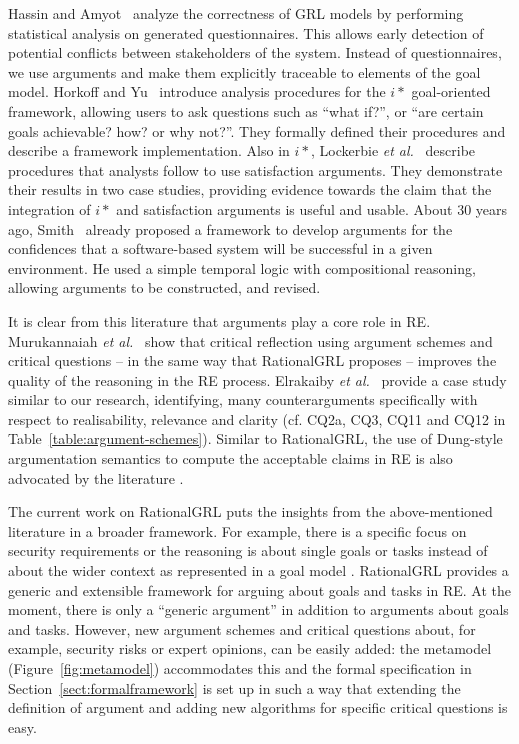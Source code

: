 Hassin and Amyot~\cite{hassine2016questionnaire} analyze the correctness of GRL models by performing statistical analysis on generated questionnaires. This allows early detection of potential conflicts between stakeholders of the system. Instead of questionnaires, we use arguments and make them explicitly traceable to elements of the goal model. Horkoff and Yu~\cite{horkoff2016interactive} introduce analysis procedures for the $i*$ goal-oriented framework, allowing users to ask questions such as ``what if?'', or ``are certain goals achievable? how? or why not?''. They formally defined their procedures and describe a framework implementation. Also in $i*$, Lockerbie \emph{et al.}~\cite{lockerbie2012exploring} describe procedures that analysts follow to use satisfaction arguments. They demonstrate their results in two case studies, providing evidence towards the claim that the integration of $i*$ and satisfaction arguments is useful and usable. About 30 years ago, Smith~\cite{Smith:1997:CRF:2737426.2737493} already proposed a framework to develop arguments for the confidences that a software-based system will be successful in a given environment. He used a simple temporal logic with compositional reasoning, allowing arguments to be constructed, and revised. 


It is clear from this literature that arguments play a core role in RE. Murukannaiah \emph{et al.}~\cite{murukannaiah2015} show that critical reflection using argument schemes and critical questions -- in the same way that RationalGRL proposes -- improves the quality of the reasoning in the RE process. Elrakaiby \emph{et al.}~\cite{ElrakaibyFSGN17} provide a case study similar to our research, identifying, many counterarguments specifically with respect to realisability, relevance and clarity (cf. CQ2a, CQ3, CQ11 and CQ12 in Table~\ref{table:argument-schemes}). Similar to RationalGRL, the use of Dung-style argumentation semantics to compute the acceptable claims in RE is also advocated by the literature \cite{yu2015automated,ionita2014argumentation,ElrakaibyFSGN17}. 

The current work on RationalGRL puts the insights from the above-mentioned literature in a broader framework. For example, there is a specific focus on security requirements \cite{haley2008security,yu2015automated,ionita2014argumentation} or the reasoning is about single goals or tasks instead of about the wider context as represented in a goal model \cite{haley2008security,yu2015automated,murukannaiah2015,ElrakaibyFSGN17}. RationalGRL provides a generic and extensible framework for arguing about goals and tasks in RE. At the moment, there is only a ``generic argument'' in addition to arguments about goals and tasks. However, new argument schemes and critical questions about, for example, security risks or expert opinions, can be easily added: the metamodel (Figure~\ref{fig:metamodel}) accommodates this and the formal specification in Section~\ref{sect:formalframework} is set up in such a way that extending the definition of argument and adding new algorithms for specific critical questions is easy. 

